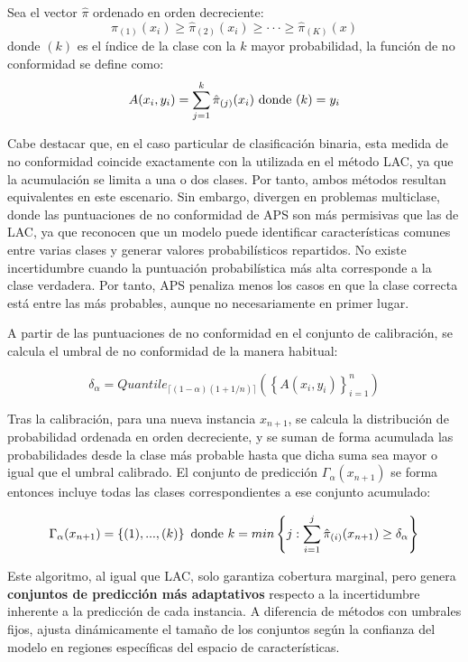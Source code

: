 Sea el vector $\hat{\pi}$ ordenado en orden decreciente: 
$$
\hat{\pi}_{(1)}(x_i) \ge \hat{\pi}_{(2)}(x_i) \ge \cdot\cdot\cdot \ge \hat{\pi}_{(K)}(x)
$$
donde $(k)$ es el índice de la clase con la $k$ mayor probabilidad, la función de no conformidad se define como:
$$
A(x_i, y_i) = \sum_{j=1}^k \hat{\pi}_{(j)}(x_i) \textnormal{ donde } (k)=y_i 
$$

Cabe destacar que, en el caso particular de clasificación binaria, esta medida de no conformidad coincide exactamente con la utilizada en el método LAC, ya que la acumulación se limita a una o dos clases. Por tanto, ambos métodos resultan equivalentes en este escenario. Sin embargo, divergen en problemas multiclase, donde las puntuaciones de no conformidad de APS son más permisivas que las de LAC, ya que reconocen que un modelo puede identificar características comunes entre varias clases y generar valores probabilísticos repartidos. No existe incertidumbre cuando la puntuación probabilística más alta corresponde a la clase verdadera. Por tanto, APS penaliza menos los casos en que la clase correcta está entre las más probables, aunque no necesariamente en primer lugar.

A partir de las puntuaciones de no conformidad en el conjunto de calibración, se calcula el umbral de no conformidad de la manera habitual:

$$
\delta_\alpha = Quantile_{ \lceil  (1-\alpha) (1 + 1/n)  \rceil } ( \left\{ A(x_i,y_i) \right\}_{i=1}^n )
$$

Tras la calibración, para una nueva instancia $x_{n+1}$, se calcula la distribución de probabilidad ordenada en orden decreciente, y se suman de forma acumulada las probabilidades desde la clase más probable hasta que dicha suma sea mayor o igual que el umbral calibrado. El conjunto de predicción $\Gamma_\alpha(x_{n+1})$ se forma entonces incluye todas las clases correspondientes a ese conjunto acumulado: 

$$
\Gamma_\alpha(x_{n+1}) = \left\{ (1),...,(k) \right\} \\ \textnormal{ donde } 
k = min\left\{ j: \sum_{i=1}^{j} \hat{\pi}_{(i)}(x_{n+1}) \ge \delta_\alpha \right\} 
$$

Este algoritmo, al igual que LAC, solo garantiza cobertura marginal, pero genera \textbf{conjuntos de predicción más adaptativos} respecto a la incertidumbre inherente a la predicción de cada instancia. A diferencia de métodos con umbrales fijos, ajusta dinámicamente el tamaño de los conjuntos según la confianza del modelo en regiones específicas del espacio de características.

